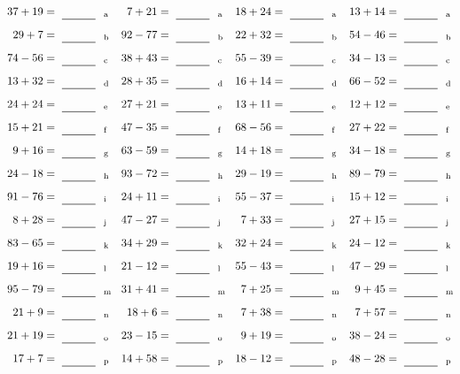 \documentclass
[
  draft    = true,
  fontsize = 11pt,
  parskip  = half-
]
{scrartcl}
\begin{document}
\clearpage
\begin{align*}
    \pline{37+19}&=\rline{a}
  & \pline{7+21}&=\rline{a}
  & \pline{18+24}&=\rline{a}
  & \pline{13+14}&=\rline{a} \\[1ex]
    \pline{29+7}&=\rline{b}
  & \pline{92-77}&=\rline{b}
  & \pline{22+32}&=\rline{b}
  & \pline{54-46}&=\rline{b} \\[1ex]
    \pline{74-56}&=\rline{c}
  & \pline{38+43}&=\rline{c}
  & \pline{55-39}&=\rline{c}
  & \pline{34-13}&=\rline{c} \\[1ex]
    \pline{13+32}&=\rline{d}
  & \pline{28+35}&=\rline{d}
  & \pline{16+14}&=\rline{d}
  & \pline{66-52}&=\rline{d} \\[1ex]
    \pline{24+24}&=\rline{e}
  & \pline{27+21}&=\rline{e}
  & \pline{13+11}&=\rline{e}
  & \pline{12+12}&=\rline{e} \\[1ex]
    \pline{15+21}&=\rline{f}
  & \pline{47-35}&=\rline{f}
  & \pline{68-56}&=\rline{f}
  & \pline{27+22}&=\rline{f} \\[1ex]
    \pline{9+16}&=\rline{g}
  & \pline{63-59}&=\rline{g}
  & \pline{14+18}&=\rline{g}
  & \pline{34-18}&=\rline{g} \\[1ex]
    \pline{24-18}&=\rline{h}
  & \pline{93-72}&=\rline{h}
  & \pline{29-19}&=\rline{h}
  & \pline{89-79}&=\rline{h} \\[1ex]
    \pline{91-76}&=\rline{i}
  & \pline{24+11}&=\rline{i}
  & \pline{55-37}&=\rline{i}
  & \pline{15+12}&=\rline{i} \\[1ex]
    \pline{8+28}&=\rline{j}
  & \pline{47-27}&=\rline{j}
  & \pline{7+33}&=\rline{j}
  & \pline{27+15}&=\rline{j} \\[1ex]
    \pline{83-65}&=\rline{k}
  & \pline{34+29}&=\rline{k}
  & \pline{32+24}&=\rline{k}
  & \pline{24-12}&=\rline{k} \\[1ex]
    \pline{19+16}&=\rline{l}
  & \pline{21-12}&=\rline{l}
  & \pline{55-43}&=\rline{l}
  & \pline{47-29}&=\rline{l} \\[1ex]
    \pline{95-79}&=\rline{m}
  & \pline{31+41}&=\rline{m}
  & \pline{7+25}&=\rline{m}
  & \pline{9+45}&=\rline{m} \\[1ex]
    \pline{21+9}&=\rline{n}
  & \pline{18+6}&=\rline{n}
  & \pline{7+38}&=\rline{n}
  & \pline{7+57}&=\rline{n} \\[1ex]
    \pline{21+19}&=\rline{o}
  & \pline{23-15}&=\rline{o}
  & \pline{9+19}&=\rline{o}
  & \pline{38-24}&=\rline{o} \\[1ex]
    \pline{17+7}&=\rline{p}
  & \pline{14+58}&=\rline{p}
  & \pline{18-12}&=\rline{p}
  & \pline{48-28}&=\rline{p}
\end{align*}
\end{document}
